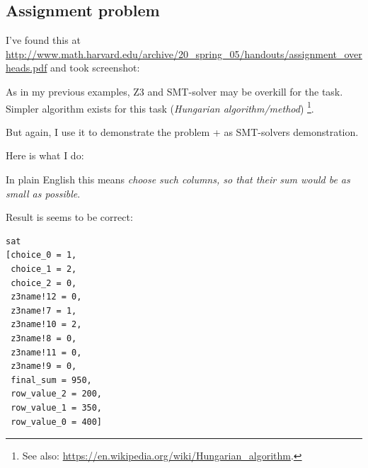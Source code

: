 \subsection{Assignment problem}

I've found this at \url{http://www.math.harvard.edu/archive/20_spring_05/handouts/assignment_overheads.pdf} and took screenshot:

\begin{figure}[H]
\centering
{}
\end{figure}

As in my previous examples, Z3 and SMT-solver may be overkill for the task.
Simpler algorithm exists for this task (\textit{Hungarian algorithm/method})
\footnote{See also: \url{https://en.wikipedia.org/wiki/Hungarian_algorithm}.}.

But again, I use it to demonstrate the problem + as SMT-solvers demonstration.

Here is what I do:



In plain English this means \textit{choose such columns, so that their sum would be as small as possible}.

Result is seems to be correct:

\begin{lstlisting}
sat
[choice_0 = 1,
 choice_1 = 2,
 choice_2 = 0,
 z3name!12 = 0,
 z3name!7 = 1,
 z3name!10 = 2,
 z3name!8 = 0,
 z3name!11 = 0,
 z3name!9 = 0,
 final_sum = 950,
 row_value_2 = 200,
 row_value_1 = 350,
 row_value_0 = 400]
\end{lstlisting}

